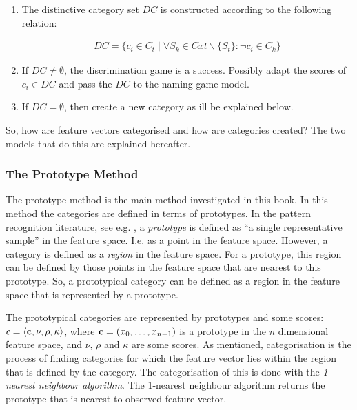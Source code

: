 \begin{enumerate}

\item The distinctive category set $DC$ is constructed according to the following relation:

\begin{eqnarray}
DC = \{c_i \in C_t \mid \forall S_k \in Cxt \backslash \{S_t\}: \neg c_i \in C_k\}
\end{eqnarray}

\item If $DC \neq \emptyset$, the discrimination game is a success. Possibly adapt the scores of $c_i \in DC$ and pass the $DC$ to the naming game model.

\item If $DC = \emptyset$, then create a new category as ill be explained below.

\end{enumerate}


So, how are feature vectors categorised and how are categories created? The two models that do this are explained hereafter.

\subsubsection{The Prototype Method}\label{s:cm:prototype}


The prototype method is the main method investigated in this book. In this method the categories are defined in terms of prototypes. In the pattern recognition literature, see e.g. \citep{banks:1990}, a {\em prototype} is defined as ``a single representative sample'' in the feature space. I.e. as a point in the feature space. However, a category is defined as a {\em region} in the feature space. For a prototype, this region can be defined by those points in the feature space that are nearest to this prototype. So, a prototypical category can be defined as a region in the feature space that is represented by a prototype.


The prototypical categories are represented by prototypes and some scores: $c=\langle {\bf c},\nu,\rho,\kappa \rangle$, where ${\bf c}=(x_0,\ldots,x_{n-1})$ is a prototype in the $n$ dimensional feature space, and $\nu$, $\rho$ and $\kappa$ are some scores. As mentioned, categorisation is the process of finding categories for which the feature vector lies within the region that is defined by the category. The categorisation of this is done with the {\em 1-nearest neighbour algorithm}. The 1-nearest neighbour algorithm returns the prototype that is nearest to observed feature vector. 

